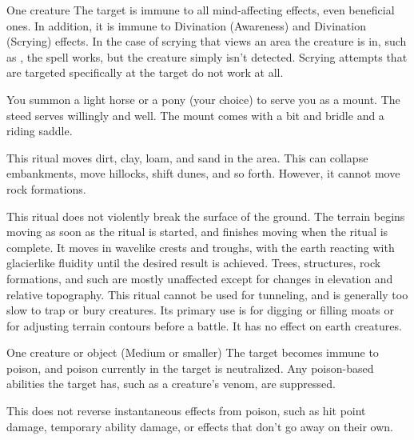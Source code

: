 \spellrng{\rngclose}
\spelldur{\durext}
\begin{spelltarget}{One creature}
    \spelleffect The target is immune to all mind-affecting effects, even beneficial ones. In addition, it is immune to Divination (Awareness) and Divination (Scrying) effects. In the case of scrying that views an area the creature is in, such as , the spell works, but the creature simply isn't detected. Scrying attempts that are targeted specifically at the target do not work at all.
\end{spelltarget}

\spellrng{\rngclose}
\spelldur{\durext \dismissable}
\spellline
\spelleffect You summon a light horse or a pony (your choice) to serve you as a mount. The steed serves willingly and well. The mount comes with a bit and bridle and a riding saddle.

\spellrng{\rnglong}
\spellline
\spelleffect This ritual moves dirt, clay, loam, and sand in the area. This can collapse embankments, move hillocks, shift dunes, and so forth. However, it cannot move rock formations. 

This ritual does not violently break the surface of the ground. The terrain begins moving as soon as the ritual is started, and finishes moving when the ritual is complete. It moves in wavelike crests and troughs, with the earth reacting with glacierlike fluidity until the desired result is achieved. Trees, structures, rock formations, and such are mostly unaffected except for changes in elevation and relative topography.
\spellnotes This ritual cannot be used for tunneling, and is generally too slow to trap or bury creatures. Its primary use is for digging or filling moats or for adjusting terrain contours before a battle. It has no effect on earth creatures.

\spelldur{\durext \dismissable}
\begin{spelltarget}{One creature or object (Medium or smaller)}
    \spelleffect The target becomes immune to poison, and poison currently in the target is neutralized. Any poison-based abilities the target has, such as a creature's venom, are suppressed.
\end{spelltarget}
\spellnotes This does not reverse instantaneous effects from poison, such as hit point damage, temporary ability damage, or effects that don't go away on their own.

